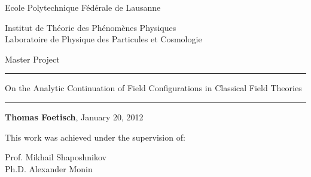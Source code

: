 \begin{adjustwidth}{-4.1cm}{-4.1cm}
  \center
  \parbox{16cm}{\center \LARGE \sc
    Ecole Polytechnique Fédérale de Lausanne\\
    \parbox{\textwidth}{\center \large
      Institut de Théorie des Phénomènes Physiques\\
      Laboratoire de Physique des Particules et Cosmologie}
    \vspace{1cm}
  }

  \parbox{\textwidth}{\Huge\center
    Master Project
    \vspace{1cm}}

  \rule{18cm}{3pt}
  \parbox{16cm}{
    \vspace{1cm}
    \Huge\center
    On the Analytic Continuation of Field
    Configurations in Classical Field Theories
    \vspace{1cm}
  }
  \rule{18cm}{3pt}

  \vspace{2cm}
  \begin{abstract}
    \center
    \parbox{11cm}{
      \setlength{\parindent}{18pt}
      \em 
    }
  \end{abstract}

  \parbox{10cm}{\vspace{2cm}\center \large
    {\bfseries Thomas Foetisch}, January 20, 2012
  }

  \vspace{4cm}
  \parbox[t]{9cm}{\flushleft \large
    This work was achieved under the supervision of:
  }
  \parbox[t]{7cm}{\flushright \large
    Prof. Mikhail Shaposhnikov\\
    Ph.D. Alexander Monin
  }
\end{adjustwidth}
